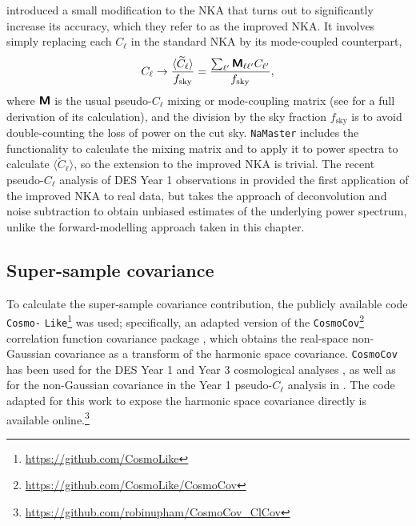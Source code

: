\citet{Nicola2021} introduced a small modification to the NKA that turns out to significantly increase its accuracy, which they refer to as the improved NKA. It involves simply replacing each $C_\ell$ in the standard NKA by its mode-coupled counterpart,
\begin{equation}
C_\ell \rightarrow
\frac{\langle \widetilde{C}_\ell \rangle}{f_\text{sky}}
= \frac{\sum_{\ell'}
\bm{\mathsf{M}}_{\ell \ell'}
C_{\ell'}}{f_\text{sky}},
\end{equation}
where
$\bm{\mathsf{M}}$
is the usual pseudo-$C_\ell$ mixing or mode-coupling matrix (see \citealt{Brown2005} for a full derivation of its calculation), and the division by the sky fraction $f_\text{sky}$ is to avoid double-counting the loss of power on the cut sky. \texttt{NaMaster} includes the functionality to calculate the mixing matrix and to apply it to power spectra to calculate $\langle \widetilde{C}_\ell \rangle$, so the extension to the improved NKA is trivial. The recent pseudo-$C_\ell$ analysis of DES Year 1 observations in \citet{Camacho2021} provided the first application of the improved NKA to real data, but takes the approach of deconvolution and noise subtraction to obtain unbiased estimates of the underlying power spectrum, unlike the forward-modelling approach taken in this chapter.

\subsection{Super-sample covariance}
\label{cov_sec:ssc}

To calculate the super-sample covariance contribution, the publicly available code \texttt{Cosmo-} \texttt{Like}\footnote{\url{https://github.com/CosmoLike}} \citep{Krause2017CosmoLike} was used;
specifically,
an adapted version of the \texttt{CosmoCov}\footnote{\url{https://github.com/CosmoLike/CosmoCov}} correlation function covariance package \citep{Fang2020CosmoCov}, which obtains the real-space non-Gaussian covariance as a transform of the harmonic space covariance. \texttt{CosmoCov} has been used for the DES Year 1 and Year 3 cosmological analyses \citep{Krause2017, Krause2021, Friedrich2021}, as well as for the non-Gaussian covariance in the Year 1 pseudo-$C_\ell$ analysis in \citet{Camacho2021}.
The code adapted for this work to expose the harmonic space covariance directly is available online.\footnote{\url{https://github.com/robinupham/CosmoCov_ClCov}}

